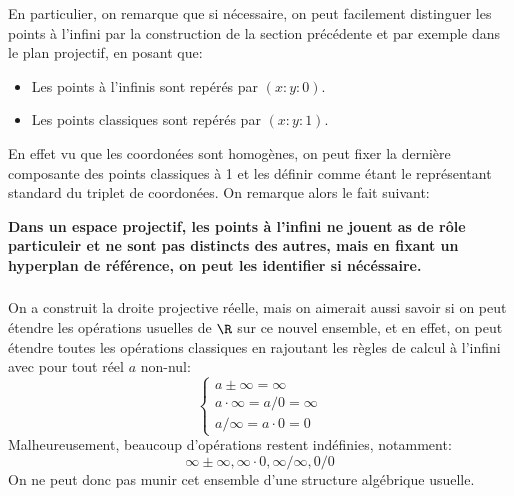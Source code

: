 \documentclass{report}
\begin{document}
   En particulier, on remarque que si nécessaire, on peut facilement distinguer les points à l'infini par la construction de la section précédente et par exemple dans le plan projectif, en posant que:
   \begin{itemize}
      \item Les points à l'infinis sont repérés par \((x : y : 0)\).
      \item Les points classiques sont repérés par \((x : y : 1)\).
   \end{itemize}
   En effet vu que les coordonées sont homogènes, on peut fixer la dernière composante des points classiques à 1 et les définir comme étant le représentant standard du triplet de coordonées. On remarque alors le fait suivant:
   \begin{center}
      \textbf{Dans un espace projectif, les points à l'infini ne jouent as de rôle particuleir et ne sont pas distincts des autres, mais en fixant un hyperplan de référence, on peut les identifier si nécéssaire.}
   \end{center}

   \subsection*{}
   On a construit la droite projective réelle, mais on aimerait aussi savoir si on peut étendre les opérations usuelles de \(\R\) sur ce nouvel ensemble, et en effet, on peut étendre toutes les opérations classiques en rajoutant les règles de calcul à l'infini avec pour tout réel \(a\) non-nul:
   \[
      \begin{cases}
         a \pm \infty = \infty\\
         a \cdot \infty = a/0 = \infty\\
         a/\infty = a \cdot 0 = 0
      \end{cases}
   \]
   Malheureusement, beaucoup d'opérations restent indéfinies, notamment:
   \[
      \infty \pm \infty, \infty \cdot 0, \infty/\infty, 0/0
   \]
   On ne peut donc pas munir cet ensemble d'une structure algébrique usuelle.

   \chapter*{}
\end{document}
